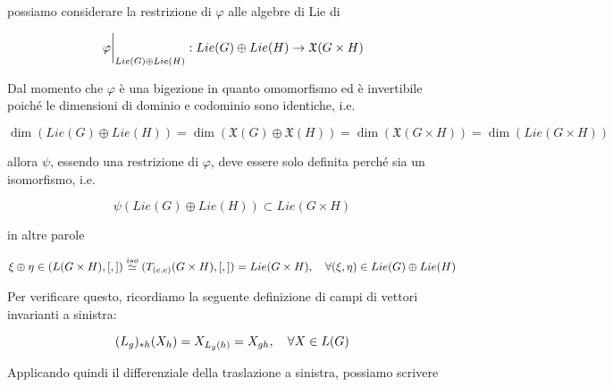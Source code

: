 {possiamo considerare la restrizione di $ \varphi $ alle algebre di Lie di

\begin{equation}
	\eval{\varphi}_{Lie(G) \oplus Lie(H)} : Lie(G) \oplus Lie(H) \to \mathfrak{X}(G \times H)
\end{equation}

Dal momento che $ \varphi $ è una bigezione in quanto omomorfismo ed è invertibile poiché le dimensioni di dominio e codominio sono identiche, i.e.

\begin{equation}
	\dim(Lie(G) \oplus Lie(H)) = \dim(\mathfrak{X}(G) \oplus \mathfrak{X}(H)) %
	= \dim(\mathfrak{X}(G \times H)) %
	= \dim(Lie(G \times H))
\end{equation}

allora $ \psi $, essendo una restrizione di $ \varphi $, deve essere solo definita perché sia un isomorfismo, i.e.

\begin{equation}
	\psi(Lie(G) \oplus Lie(H)) \subset Lie(G \times H)
\end{equation}

in altre parole

\begin{gather}
	\xi \oplus \eta \in (L(G \times H),[,]) %
	\stackrel{iso}{\simeq} (T_{(e,e)}(G \times H),[,]) %
	= Lie(G \times H) %
	\qcomma \forall (\xi,\eta) \in Lie(G) \oplus Lie(H)
\end{gather}

Per verificare questo, ricordiamo la seguente definizione di campi di vettori invarianti a sinistra:

\begin{equation}
	(L_{g})_{*h}(X_{h}) = X_{L_{g}(h)} = X_{gh} \qcomma \forall X \in L(G)
\end{equation}

Applicando quindi il differenziale della traslazione a sinistra, possiamo scrivere

}
